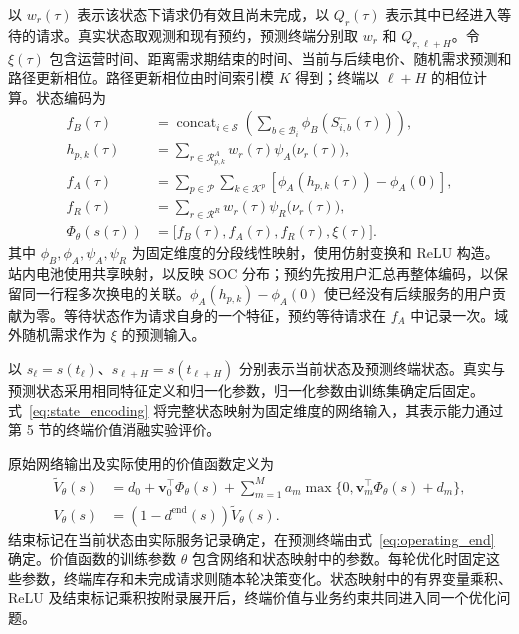 \documentclass[12pt,a4paper,UTF8]{ctexart}
\numberwithin{equation}{section}
\newcommand{\R}{\mathcal R}
\begin{document}
以 $w_r(\tau)$ 表示该状态下请求仍有效且尚未完成，以 $Q_r(\tau)$ 表示其中已经进入等待的请求。真实状态取观测和现有预约，预测终端分别取 $w_r$ 和 $Q_{r,\ell+H}$。令 $\xi(\tau)$ 包含运营时间、距离需求期结束的时间、当前与后续电价、随机需求预测和路径更新相位。路径更新相位由时间索引模 $K$ 得到；终端以 $\ell+H$ 的相位计算。状态编码为
\begin{equation}
\begin{aligned}
f_B(\tau)&=\mathop{\mathrm{concat}}_{i\in\mathcal S}
\left(\sum_{b\in\mathcal B_i}\phi_B(S_{i,b}^{-}(\tau))\right),\\
h_{p,k}(\tau)&=\sum_{r\in\R_{p,k}^A}w_r(\tau)\psi_A\bigl(\nu_r(\tau)\bigr),\\
f_A(\tau)&=\sum_{p\in\mathcal P}\sum_{k\in\mathcal K^p}
\left[\phi_A(h_{p,k}(\tau))-\phi_A(0)\right],\\
f_R(\tau)&=\sum_{r\in\R^R}w_r(\tau)\psi_R\bigl(\nu_r(\tau)\bigr),\\
\Phi_\theta(s(\tau))&=\bigl[f_B(\tau),f_A(\tau),f_R(\tau),\xi(\tau)\bigr].
\end{aligned}
\label{eq:state_encoding}
\end{equation}
其中 $\phi_B,\phi_A,\psi_A,\psi_R$ 为固定维度的分段线性映射，使用仿射变换和 ReLU 构造。站内电池使用共享映射，以反映 SOC 分布；预约先按用户汇总再整体编码，以保留同一行程多次换电的关联。$\phi_A(h_{p,k})-\phi_A(0)$ 使已经没有后续服务的用户贡献为零。等待状态作为请求自身的一个特征，预约等待请求在 $f_A$ 中记录一次。域外随机需求作为 $\xi$ 的预测输入。

以 $s_\ell=s(t_\ell)$、$s_{\ell+H}=s(t_{\ell+H})$ 分别表示当前状态及预测终端状态。真实与预测状态采用相同特征定义和归一化参数，归一化参数由训练集确定后固定。式~\eqref{eq:state_encoding} 将完整状态映射为固定维度的网络输入，其表示能力通过第 5 节的终端价值消融实验评价。

原始网络输出及实际使用的价值函数定义为
\begin{equation}
\begin{aligned}
\widetilde V_\theta(s)
&=d_0+\boldsymbol v_0^\top\Phi_\theta(s)
+\sum_{m=1}^{M}a_m\max\{0,\boldsymbol v_m^\top\Phi_\theta(s)+d_m\},\\
V_\theta(s)&=(1-d^{\mathrm{end}}(s))\widetilde V_\theta(s).
\end{aligned}
\label{eq:value_network}
\end{equation}
结束标记在当前状态由实际服务记录确定，在预测终端由式~\eqref{eq:operating_end} 确定。价值函数的训练参数 $\theta$ 包含网络和状态映射中的参数。每轮优化时固定这些参数，终端库存和未完成请求则随本轮决策变化。状态映射中的有界变量乘积、ReLU 及结束标记乘积按附录展开后，终端价值与业务约束共同进入同一个优化问题。
\end{document}
